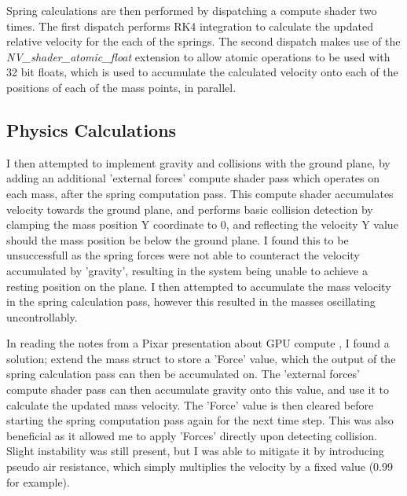 \documentclass[]{acmsiggraph}
\begin{document}
Spring calculations are then performed by dispatching a compute shader two times. The first dispatch performs RK4 integration to calculate the updated relative velocity for the each of the springs. The second dispatch makes use of the \textit{NV_shader_atomic_float} extension to allow atomic operations to be used with 32 bit floats, which is used to accumulate the calculated velocity onto each of the positions of each of the mass points, in parallel.

\subsection{Physics Calculations}

I then attempted to implement gravity and collisions with the ground plane, by adding an additional 'external forces' compute shader pass which operates on each mass, after the spring computation pass. This compute shader accumulates velocity towards the ground plane, and performs basic collision detection by clamping the mass position Y coordinate to 0, and reflecting the velocity Y value should the mass position be below the ground plane. I found this to be unsuccessfull as the spring forces were not able to counteract the velocity accumulated by 'gravity', resulting in the system being unable to achieve a resting position on the plane. I then attempted to accumulate the mass velocity in the spring calculation pass, however this resulted in the masses oscillating uncontrollably.

In reading the notes from a Pixar presentation about GPU compute \cite{siggraphPixar}, I found a solution; extend the mass struct to store a 'Force' value, which the output of the spring calculation pass can then be accumulated on. The 'external forces' compute shader pass can then accumulate gravity onto this value, and use it to calculate the updated mass velocity. The 'Force' value is then cleared before starting the spring computation pass again for the next time step. This was also beneficial as it allowed me to apply 'Forces' directly upon detecting collision. Slight instability was still present, but I was able to mitigate it by introducing pseudo air resistance, which simply multiplies the velocity by a fixed value (0.99 for example).
\end{document}
